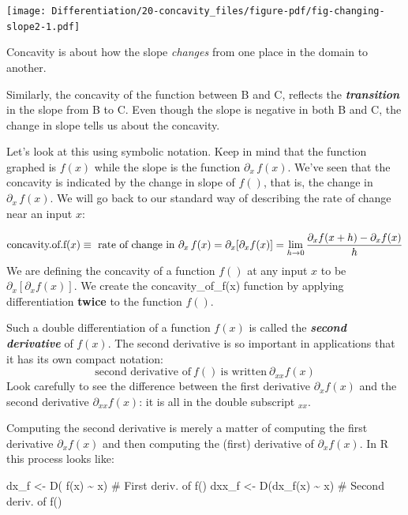 \documentclass[
  letterpaper,
  DIV=11,
  numbers=noendperiod,
  oneside]{scrreprt}
\newenvironment{Shaded}{\begin{snugshade}}{\end{snugshade}}
\newcommand{\CommentTok}[1]{\textcolor[rgb]{0.37,0.37,0.37}{#1}}
\newcommand{\FunctionTok}[1]{\textcolor[rgb]{0.28,0.35,0.67}{#1}}
\newcommand{\NormalTok}[1]{\textcolor[rgb]{0.00,0.46,0.62}{#1}}
\newcommand{\OtherTok}[1]{\textcolor[rgb]{0.00,0.46,0.62}{#1}}
\newcommand{\SpecialCharTok}[1]{\textcolor[rgb]{0.37,0.37,0.37}{#1}}
\begin{document}
\begin{marginfigure}

{\centering \texttt{[image: Differentiation/20-concavity\_files/figure-pdf/fig-changing-slope2-1.pdf]}

}

\caption{\label{fig-changing-slope2}Concavity is about how the slope
\emph{changes} from one place in the domain to another.}

\end{marginfigure}

Similarly, the concavity of the function between B and C, reflects the
\textbf{\emph{transition}} in the slope from B to C. Even though the
slope is negative in both B and C, the change in slope tells us about
the concavity.

Let's look at this using symbolic notation. Keep in mind that the
function graphed is \(f(x)\) while the slope is the function
\(\partial_x\,f(x)\). We've seen that the concavity is indicated by the
change in slope of \(f()\), that is, the change in
\(\partial_x\, f(x)\). We will go back to our standard way of describing
the rate of change near an input \(x\):

\[\text{concavity.of.f}(x) \equiv\ \text{rate of change in}\ \partial_x\, f(x) = \partial_x [\partial_x f(x)] \\
\\
= \lim_{h\rightarrow 0}\frac{\partial_x f(x+h) - \partial_x f(x)}{h}\]
We are defining the concavity of a function \(f()\) at any input \(x\)
to be \(\partial_x [\partial_x f(x)]\). We create the
concavity\_of\_f(x) function by applying differentiation \textbf{twice}
to the function \(f()\).

Such a double differentiation of a function \(f(x)\) is called the
\textbf{\emph{second derivative}} of \(f(x)\). The second derivative is
so important in applications that it has its own compact notation:
\[\text{second derivative of}\ f()\ \text{is written}\ \partial_{xx} f(x)\]
Look carefully to see the difference between the first derivative
\(\partial_x f(x)\) and the second derivative \(\partial_{xx} f(x)\): it
is all in the double subscript \(_{xx}\).

Computing the second derivative is merely a matter of computing the
first derivative \(\partial_x f(x)\) and then computing the (first)
derivative of \(\partial_x f(x)\). In R this process looks like:

\begin{Shaded}
\begin{Highlighting}[]
\NormalTok{dx\_f  }\OtherTok{\textless{}{-}} \FunctionTok{D}\NormalTok{(   }\FunctionTok{f}\NormalTok{(x) }\SpecialCharTok{\textasciitilde{}}\NormalTok{ x)   }\CommentTok{\# First deriv. of f()}
\NormalTok{dxx\_f }\OtherTok{\textless{}{-}} \FunctionTok{D}\NormalTok{(}\FunctionTok{dx\_f}\NormalTok{(x) }\SpecialCharTok{\textasciitilde{}}\NormalTok{ x)   }\CommentTok{\# Second deriv. of f()}
\end{Highlighting}
\end{Shaded}
\end{document}
